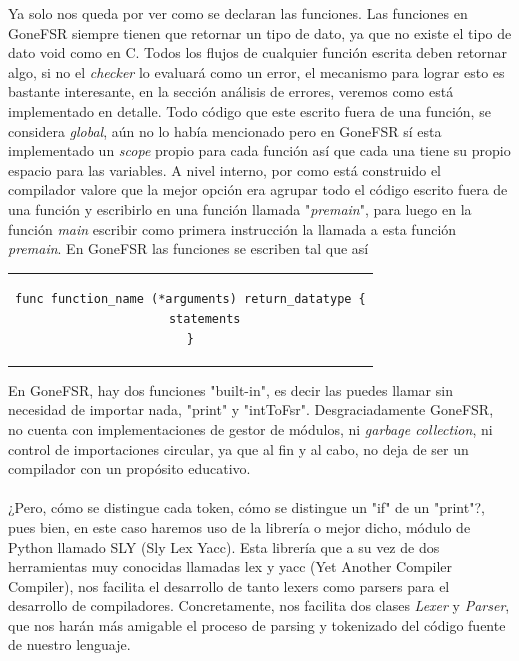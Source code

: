 Ya solo nos queda por ver como se declaran las funciones. Las funciones en GoneFSR siempre tienen que retornar un tipo de dato, ya que no existe el tipo de dato void como en C. Todos los flujos de cualquier función escrita deben retornar algo, si no el \textit{checker} lo evaluará como un error, el mecanismo para lograr esto es bastante interesante, en la sección análisis de errores, veremos como está implementado en detalle. Todo código que este escrito fuera de una función, se considera \textit{global}, aún no lo había mencionado pero en GoneFSR sí esta implementado un \textit{scope} propio para cada función así que cada una tiene su propio espacio para las variables. A nivel interno, por como está construido el compilador valore que la mejor opción era agrupar todo el código escrito fuera de una función y escribirlo en una función llamada "\textit{premain}", para luego en la función \textit{main} escribir como primera instrucción la llamada a esta función \textit{premain}. En GoneFSR las funciones se escriben tal que así
\begin{center}
\begin{tabular}{c}
\begin{lstlisting}
func function_name (*arguments) return_datatype {
    statements
}
\end{lstlisting}
\end{tabular}
\end{center}
En GoneFSR, hay dos funciones "built-in", es decir las puedes llamar sin necesidad de importar nada, "print" y "intToFsr". Desgraciadamente GoneFSR, no cuenta con implementaciones de gestor de módulos, ni \textit{garbage collection}, ni control de importaciones circular, ya que al fin y al cabo, no deja de ser un compilador con un propósito educativo.\\\\
\newpage
\noindent ¿Pero, cómo se distingue cada token, cómo se distingue un "if" de un  "print"?, pues bien, en este caso haremos uso de la librería o mejor dicho, módulo de Python llamado SLY (Sly Lex Yacc). Esta librería que a su vez de dos herramientas muy conocidas llamadas lex y yacc (Yet Another Compiler Compiler), nos facilita el desarrollo de tanto lexers como parsers para el desarrollo de compiladores. Concretamente, nos facilita dos clases  \textit{Lexer} y \textit{Parser}, que nos harán más amigable el proceso de parsing y tokenizado del código fuente de nuestro lenguaje. \\\\
